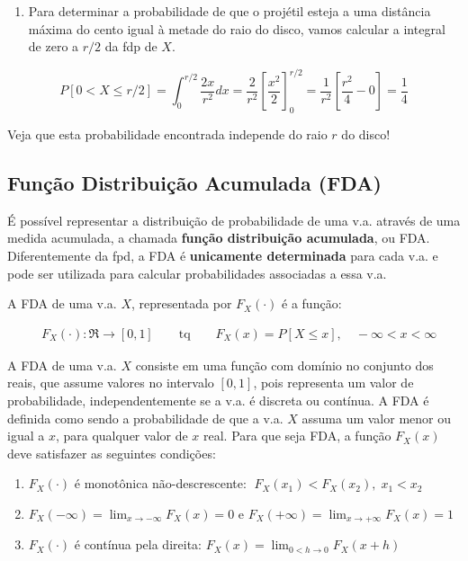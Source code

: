\documentclass[
]{book}
\providecommand{\tightlist}{%
  \setlength{\itemsep}{0pt}\setlength{\parskip}{0pt}}
\theoremstyle{definition}
\theoremstyle{definition}
\theoremstyle{definition}
\theoremstyle{remark}
\begin{document}
\begin{enumerate}
\def\labelenumi{\arabic{enumi}.}
\setcounter{enumi}{1}
\tightlist
\item
  Para determinar a probabilidade de que o projétil esteja a uma distância máxima do cento igual à metade do raio do disco, vamos calcular a integral de zero a \(r/2\) da fdp de \(X\).
\end{enumerate}

\[P[0 < X \leq r/2] =  \int_{0}^{r/2} \frac{2x}{r^2} dx = \frac{2}{r^2}\left[\frac{x^2}{2}\right]_{0}^{r/2} = \frac{1}{r^2}\left[\frac{r^2}{4} - 0 \right] = \frac{1}{4}\]

Veja que esta probabilidade encontrada independe do raio \(r\) do disco!

\hypertarget{funuxe7uxe3o-distribuiuxe7uxe3o-acumulada-fda}{%
\subsection*{Função Distribuição Acumulada (FDA)}\label{funuxe7uxe3o-distribuiuxe7uxe3o-acumulada-fda}}

É possível representar a distribuição de probabilidade de uma v.a. através de uma medida acumulada, a chamada \textbf{função distribuição acumulada}, ou FDA. Diferentemente da fpd, a FDA é \textbf{unicamente determinada} para cada v.a. e pode ser utilizada para calcular probabilidades associadas a essa v.a.

A FDA de uma v.a. \(X\), representada por \({F_X(\cdot)}\) é a função:

\begin{align*}
  &{} {F_X(\cdot): \Re \rightarrow [0, 1]\qquad \text{tq} \qquad
      F_X(x) = P[X \leq x], \quad -\infty < x < \infty}
\end{align*}

A FDA de uma v.a. \(X\) consiste em uma função com domínio no conjunto dos reais, que assume valores no intervalo \([0,1]\), pois representa um valor de probabilidade, independentemente se a v.a. é discreta ou contínua. A FDA é definida como sendo a probabilidade de que a v.a. \(X\) assuma um valor menor ou igual a \(x\), para qualquer valor de \(x\) real. Para que seja FDA, a função \(F_X(x)\) deve satisfazer as seguintes condições:

\begin{enumerate}
\def\labelenumi{\arabic{enumi}.}
\item
  \({F_X(\cdot)}\) é monotônica não-descrescente: \(\;{F_X(x_1) < F_X(x_2), \; x_1 < x_2}\)
\item
  \({F_X(-\infty) = \lim_{x \rightarrow -\infty}F_X(x) = 0}\) e \({F_X(+\infty) = \lim_{x \rightarrow +\infty}F_X(x) = 1}\)
\item
  \({F_X(\cdot)}\) é contínua pela direita: \({F_X(x) = \lim_{0<h \rightarrow 0} F_X(x+h)}\)
\end{enumerate}
\end{document}
